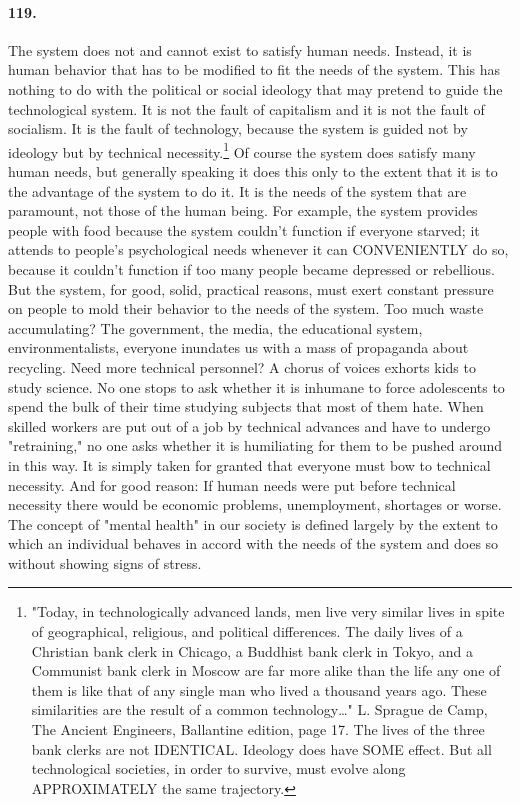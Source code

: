 \documentclass[12pt]{book}
\begin{document}
\paragraph{119.} The system does not and cannot exist to satisfy human needs.  Instead, it is human behavior that has to be modified to fit the needs of the system. This has nothing to do with the political or social ideology that may pretend to guide the technological system. It is not the fault of capitalism and it is not the fault of socialism. It is the fault of technology, because the system is guided not by ideology but by technical necessity.\footnote{"Today, in technologically advanced lands, men live very similar lives in spite of geographical, religious, and political differences. The daily lives of a Christian bank clerk in Chicago, a Buddhist bank clerk in Tokyo, and a Communist bank clerk in Moscow are far more alike than the life any one of them is like that of any single man who lived a thousand years ago. These similarities are the result of a common technology\dots{}" L. Sprague de Camp, The Ancient Engineers, Ballantine edition, page 17. The lives of the three bank clerks are not IDENTICAL. Ideology does have SOME effect. But all technological societies, in order to survive, must evolve along APPROXIMATELY the same trajectory.} Of course the system does satisfy many human needs, but generally speaking it does this only to the extent that it is to the advantage of the system to do it. It is the needs of the system that are paramount, not those of the human being. For example, the system provides people with food because the system couldn't function if everyone starved; it attends to people's psychological needs whenever it can CONVENIENTLY do so, because it couldn't function if too many people became depressed or rebellious. But the system, for good, solid, practical reasons, must exert constant pressure on people to mold their behavior to the needs of the system. Too much waste accumulating? The government, the media, the educational system, environmentalists, everyone inundates us with a mass of propaganda about recycling. Need more technical personnel? A chorus of voices exhorts kids to study science. No one stops to ask whether it is inhumane to force adolescents to spend the bulk of their time studying subjects that most of them hate. When skilled workers are put out of a job by technical advances and have to undergo "retraining," no one asks whether it is humiliating for them to be pushed around in this way. It is simply taken for granted that everyone must bow to technical necessity. And for good reason: If human needs were put before technical necessity there would be economic problems, unemployment, shortages or worse. The concept of "mental health" in our society is defined largely by the extent to which an individual behaves in accord with the needs of the system and does so without showing signs of stress.
\end{document}
